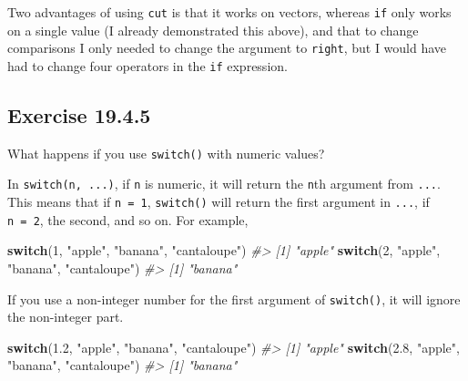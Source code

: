 \documentclass[]{book}
\newenvironment{Shaded}{\begin{snugshade}}{\end{snugshade}}
\newcommand{\CommentTok}[1]{\textcolor[rgb]{0.56,0.35,0.01}{\textit{#1}}}
\newcommand{\ControlFlowTok}[1]{\textcolor[rgb]{0.13,0.29,0.53}{\textbf{#1}}}
\newcommand{\DecValTok}[1]{\textcolor[rgb]{0.00,0.00,0.81}{#1}}
\newcommand{\FloatTok}[1]{\textcolor[rgb]{0.00,0.00,0.81}{#1}}
\newcommand{\NormalTok}[1]{#1}
\newcommand{\StringTok}[1]{\textcolor[rgb]{0.31,0.60,0.02}{#1}}
\theoremstyle{plain}
\theoremstyle{remark}
\begin{document}
Two advantages of using \texttt{cut} is that it works on vectors,
whereas \texttt{if} only works on a single value (I already demonstrated
this above), and that to change comparisons I only needed to change the
argument to \texttt{right}, but I would have had to change four
operators in the \texttt{if} expression.

\hypertarget{exercise-19.4.5}{%
\subsection*{\texorpdfstring{Exercise
{19.4.5}}{Exercise 19.4.5}}\label{exercise-19.4.5}}

What happens if you use \texttt{switch()} with numeric values?

In \texttt{switch(n,\ ...)}, if \texttt{n} is numeric, it will return
the \texttt{n}th argument from \texttt{...}. This means that if
\texttt{n\ =\ 1}, \texttt{switch()} will return the first argument in
\texttt{...}, if \texttt{n\ =\ 2}, the second, and so on. For example,

\begin{Shaded}
\begin{Highlighting}[]
\ControlFlowTok{switch}\NormalTok{(}\DecValTok{1}\NormalTok{, }\StringTok{"apple"}\NormalTok{, }\StringTok{"banana"}\NormalTok{, }\StringTok{"cantaloupe"}\NormalTok{)}
\CommentTok{#> [1] "apple"}
\ControlFlowTok{switch}\NormalTok{(}\DecValTok{2}\NormalTok{, }\StringTok{"apple"}\NormalTok{, }\StringTok{"banana"}\NormalTok{, }\StringTok{"cantaloupe"}\NormalTok{)}
\CommentTok{#> [1] "banana"}
\end{Highlighting}
\end{Shaded}

If you use a non-integer number for the first argument of
\texttt{switch()}, it will ignore the non-integer part.

\begin{Shaded}
\begin{Highlighting}[]
\ControlFlowTok{switch}\NormalTok{(}\FloatTok{1.2}\NormalTok{, }\StringTok{"apple"}\NormalTok{, }\StringTok{"banana"}\NormalTok{, }\StringTok{"cantaloupe"}\NormalTok{)}
\CommentTok{#> [1] "apple"}
\ControlFlowTok{switch}\NormalTok{(}\FloatTok{2.8}\NormalTok{, }\StringTok{"apple"}\NormalTok{, }\StringTok{"banana"}\NormalTok{, }\StringTok{"cantaloupe"}\NormalTok{)}
\CommentTok{#> [1] "banana"}
\end{Highlighting}
\end{Shaded}
\end{document}

